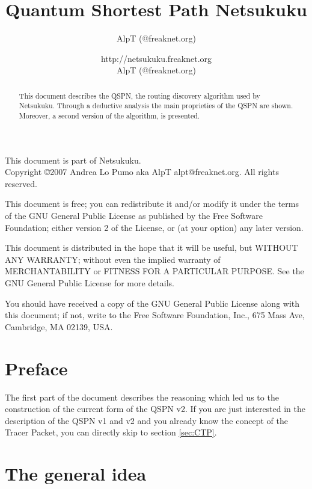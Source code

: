 \documentclass[a4paper]{article}
\title{Quantum Shortest Path Netsukuku}
\author{AlpT (@freaknet.org)}
\author{http://netsukuku.freaknet.org\\AlpT (@freaknet.org)}
\begin{document}
\maketitle

\begin{abstract}
	This document describes the QSPN, the routing discovery algorithm used
	by Netsukuku.
	Through a deductive analysis the main proprieties of the QSPN are
	shown. Moreover, a second version of the algorithm, is presented.
\end{abstract}
\pagebreak
\begin{small}
  This document is part of Netsukuku.\\
  Copyright \copyright 2007 Andrea Lo Pumo aka AlpT alpt@freaknet.org.
  All rights reserved.

  This document is free; you can redistribute it and/or modify it
  under the terms of the GNU General Public License as published by
  the Free Software Foundation; either version 2 of the License, or
  (at your option) any later version.

  This document is distributed in the hope that it will be useful, but
  WITHOUT ANY WARRANTY; without even the implied warranty of
  MERCHANTABILITY or FITNESS FOR A PARTICULAR PURPOSE\@.  See the GNU
  General Public License for more details.

  You should have received a copy of the GNU General Public License
  along with this document; if not, write to the Free Software
  Foundation, Inc., 675 Mass Ave, Cambridge, MA 02139, USA.
\end{small}

\clearpage
\tableofcontents
\clearpage
{}

\section{Preface}
\label{sec:preface}

The first part of the document describes the reasoning which led us to the
construction of the current form of the QSPN v2.
If you are just interested in the description of the QSPN v1 and v2 and you
already know the concept of the Tracer Packet, you can directly skip to
section \ref{sec:CTP}.

\section{The general idea}
\label{sec:general_idea}
\end{document}

